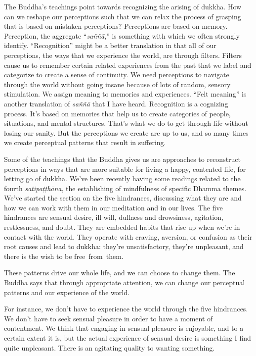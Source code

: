 The Buddha's teachings point towards recognizing the arising of dukkha. How can we reshape our perceptions such that we can relax the process of grasping that is based on mistaken perceptions? Perceptions are based on memory. Perception, the aggregate ``\emph{saññā},'' is something with which we often strongly identify. ``Recognition'' might be a better translation in that all of our perceptions, the ways that we experience the world, are through filters. Filters cause us to remember certain related experiences from the past that we label and categorize to create a sense of continuity. We need perceptions to navigate through the world without going insane because of lots of random, sensory stimulation. We assign meaning to memories and experiences. ``Felt meaning'' is another translation of \emph{saññā} that I have heard. Recognition is a cognizing process. It's based on memories that help us to create categories of people, situations, and mental structures. That's what we do to get through life without losing our sanity. But the perceptions we create are up to us, and so many times we create perceptual patterns that result in suffering.

Some of the teachings that the Buddha gives us are approaches to reconstruct perceptions in ways that are more suitable for living a happy, contented life, for letting go of dukkha. We've been recently having some readings related to the fourth \emph{satipaṭṭhāna}, the establishing of mindfulness of specific Dhamma themes. We've started the section on the five hindrances, discussing what they are and how we can work with them in our meditation and in our lives. The five hindrances are sensual desire, ill will, dullness and drowsiness, agitation, restlessness, and doubt. They are embedded habits that rise up when we're in contact with the world. They operate with craving, aversion, or confusion as their root causes and lead to dukkha: they're unsatisfactory, they're unpleasant, and there is the wish to be \mbox{free from them.}

These patterns drive our whole life, and we can choose to change them. The Buddha says that through appropriate attention, we can change our perceptual patterns and our experience of the world.

For instance, we don't have to experience the world through the five hindrances. We don't have to seek sensual pleasure in order to have a moment of contentment. We think that engaging in sensual pleasure is enjoyable, and to a certain extent it is, but the actual experience of sensual desire is something I find quite unpleasant. There is an agitating quality to wanting something.

